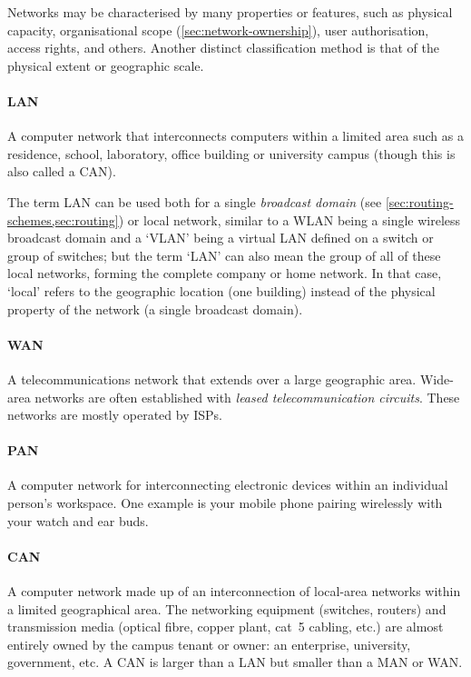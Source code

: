 {Networks may be characterised by many properties or features, such as physical capacity, organisational scope (\vref{sec:network-ownership}), user authorisation, access rights, and others.
Another distinct classification method is that of the physical extent or geographic scale.

\paragraph{\gls{LAN}}
A computer network that interconnects computers within a limited area such as a residence, school, laboratory, office building or university campus (though this is also called a \acl{CAN}).

The term \gls{LAN} can be used both for a single \emph{broadcast domain} (see \vref{sec:routing-schemes,sec:routing}) or local network, similar to a \acs{WLAN} being a single wireless broadcast domain and a `\acs{VLAN}' being a virtual \gls{LAN} defined on a switch or group of switches; but the term `\gls{LAN}' can also mean the group of all of these local networks, forming the complete company or home network.
In that case, `local' refers to the geographic location (one building) instead of the physical property of the network (a single broadcast domain).

\paragraph{\gls{WAN}}
A telecommunications network that extends over a large geographic area.
Wide-area networks are often established with \emph{leased telecommunication circuits}.
These networks are mostly operated by \glspl{ISP}.

\paragraph{\gls{PAN}}
A computer network for interconnecting electronic devices within an individual person's workspace.
One example is your mobile phone pairing wirelessly with your watch and ear buds.

\paragraph{\gls{CAN}}
A computer network made up of an interconnection of local-area networks within a limited geographical area.
The networking equipment (switches, routers) and transmission media (optical fibre, copper plant, cat~5 cabling, etc.) are almost entirely owned by the campus tenant or owner: an enterprise, university, government, etc.
A \acl{CAN} is larger than a \acl{LAN} but smaller than a \acs{MAN} or \gls{WAN}.

}
